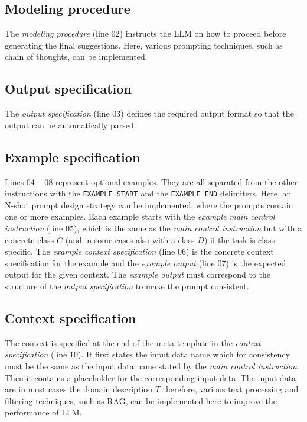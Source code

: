 \subsection{Modeling procedure}

The \textit{modeling procedure} (line 02) instructs the LLM on how to proceed before generating the final suggestions. Here, various prompting techniques, such as chain of thoughts, can be implemented.


\subsection{Output specification}

The \textit{output specification} (line 03) defines the required output format so that the output can be automatically parsed.


\subsection{Example specification}

Lines 04 -- 08 represent optional examples. They are all separated from the other instructions with the \texttt{EXAMPLE START} and the \texttt{EXAMPLE END} delimiters. Here, an N-shot prompt design strategy can be implemented, where the prompts contain one or more examples. Each example starts with the \emph{example main control instruction} (line 05), which is the same as the \emph{main control instruction} but with a concrete class $C$ (and in some cases also with a class $D$) if the task is class-specific. The \emph{example context specification} (line 06) is the concrete context specification for the example and the \emph{example output} (line 07) is the expected output for the given context. The \emph{example output} must correspond to the structure of the \emph{output specification} to make the prompt consistent.


\subsection{Context specification}

The context is specified at the end of the meta-template in the \emph{context specification} (line 10). It first states the input data name which for consistency must be the same as the input data name stated by the \emph{main control instruction}. Then it contains a placeholder for the corresponding input data. The input data are in most cases the domain description $T$ therefore, various text processing and filtering techniques, such as RAG, can be implemented here to improve the performance of LLM.